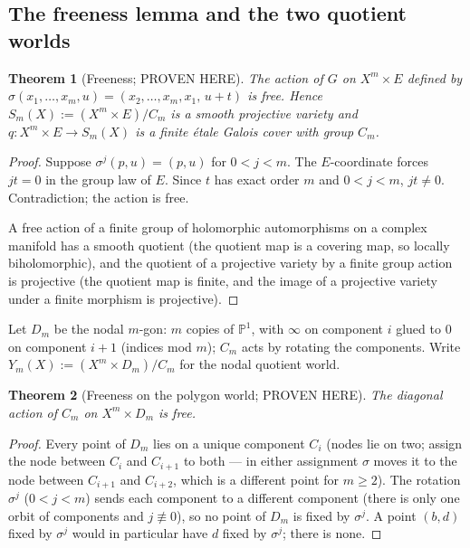 \documentclass[11pt]{article}
\newtheorem{theorem}{Theorem}
\begin{document}
\subsection{The freeness lemma and the two quotient worlds}

\begin{theorem}[Freeness; PROVEN HERE]
The action of $G$ on $X^m\times E$ defined by
$\sigma(x_1,\dots,x_m,u)=(x_2,\dots,x_m,x_1,\,u+t)$ is free. Hence
$S_m(X):=(X^m\times E)/C_m$ is a smooth projective variety and
$q\colon X^m\times E\to S_m(X)$ is a finite \'etale Galois cover with
group $C_m$.
\end{theorem}

\begin{proof}
Suppose $\sigma^j(p,u)=(p,u)$ for $0<j<m$. The $E$-coordinate forces
$jt=0$ in the group law of $E$. Since $t$ has exact order $m$ and
$0<j<m$, $jt\ne0$. Contradiction; the action is free.

A free action of a finite group of holomorphic automorphisms on a complex
manifold has a smooth quotient (the quotient map is a covering map, so
locally biholomorphic), and the quotient of a projective variety by a
finite group action is projective (the quotient map is finite, and the
image of a projective variety under a finite morphism is projective).
\end{proof}

Let $D_m$ be the nodal $m$-gon: $m$ copies of $\mathbb P^1$, with
$\infty$ on component $i$ glued to $0$ on component $i+1$ (indices mod
$m$); $C_m$ acts by rotating the components. Write
$Y_m(X):=(X^m\times D_m)/C_m$ for the nodal quotient world.

\begin{theorem}[Freeness on the polygon world; PROVEN HERE]
The diagonal action of $C_m$ on $X^m\times D_m$ is free.
\end{theorem}

\begin{proof}
Every point of $D_m$ lies on a unique component $C_i$ (nodes lie on
two; assign the node between $C_i$ and $C_{i+1}$ to both --- in either
assignment $\sigma$ moves it to the node between $C_{i+1}$ and
$C_{i+2}$, which is a different point for $m\ge2$). The rotation
$\sigma^j$ ($0<j<m$) sends each component to a different component
(there is only one orbit of components and $j\not\equiv0$), so no point
of $D_m$ is fixed by $\sigma^j$. A point $(b,d)$ fixed by $\sigma^j$
would in particular have $d$ fixed by $\sigma^j$; there is none.
\end{proof}
\end{document}
